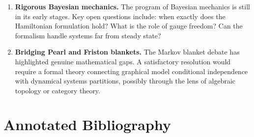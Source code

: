\documentclass[11pt,a4paper]{article}
\theoremstyle{definition}
\begin{document}
\begin{enumerate}[leftmargin=2em]
  \item \textbf{Rigorous Bayesian mechanics.}
    The program of Bayesian mechanics is still in its early stages.  Key open
    questions include: when exactly does the Hamiltonian formulation hold?
    What is the role of gauge freedom?  Can the formalism handle systems far
    from steady state?

  \item \textbf{Bridging Pearl and Friston blankets.}
    The Markov blanket debate has highlighted genuine mathematical gaps.
    A satisfactory resolution would require a formal theory connecting
    graphical model conditional independence with dynamical systems partitions,
    possibly through the lens of algebraic topology or category theory.
\end{enumerate}


\section{Annotated Bibliography}
\label{sec:bib}
\end{document}
